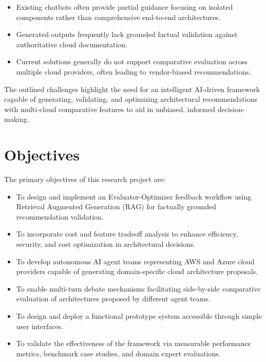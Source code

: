 \begin{itemize}
    \item Existing chatbots often provide partial guidance focusing on isolated components rather than comprehensive end-to-end architectures.
    \item Generated outputs frequently lack grounded factual validation against authoritative cloud documentation.
    \item Current solutions generally do not support comparative evaluation across multiple cloud providers, often leading to vendor-biased recommendations.
\end{itemize}

The outlined challenges highlight the need for an intelligent AI-driven framework capable of generating, validating, and optimizing architectural recommendations with multi-cloud comparative features to aid in unbiased, informed decision-making. %

\section{Objectives}

The primary objectives of this research project are:

\begin{itemize}
    \item To design and implement an Evaluator-Optimizer feedback workflow using Retrieval Augmented Generation (RAG) for factually grounded recommendation validation.
    \item To incorporate cost and feature tradeoff analysis to enhance efficiency, security, and cost optimization in architectural decisions.
    \item To develop autonomous AI agent teams representing AWS and Azure cloud providers capable of generating domain-specific cloud architecture proposals.
    \item To enable multi-turn debate mechanisms facilitating side-by-side comparative evaluation of architectures proposed by different agent teams.
    \item To design and deploy a functional prototype system accessible through simple user interfaces.
    \item To validate the effectiveness of the framework via measurable performance metrics, benchmark case studies, and domain expert evaluations.
\end{itemize}

